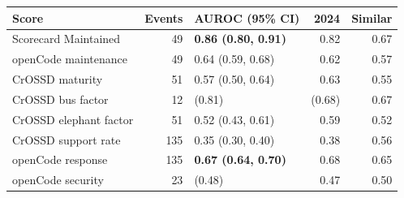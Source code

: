 \begin{tabular}{lrlrr}
\toprule
Score & Events & AUROC (95\% CI) & 2024 & Similar \\
\midrule
Scorecard Maintained & 49 & \textbf{0.86 (0.80, 0.91)} & 0.82 & 0.67 \\
openCode maintenance & 49 & 0.64 (0.59, 0.68) & 0.62 & 0.57 \\
CrOSSD maturity & 51 & 0.57 (0.50, 0.64) & 0.63 & 0.55 \\
CrOSSD bus factor & 12 & (0.81) & (0.68) & 0.67 \\
CrOSSD elephant factor & 51 & 0.52 (0.43, 0.61) & 0.59 & 0.52 \\
CrOSSD support rate & 135 & 0.35 (0.30, 0.40) & 0.38 & 0.56 \\
openCode response & 135 & \textbf{0.67 (0.64, 0.70)} & 0.68 & 0.65 \\
openCode security & 23 & (0.48) & 0.47 & 0.50 \\
\bottomrule
\end{tabular}
